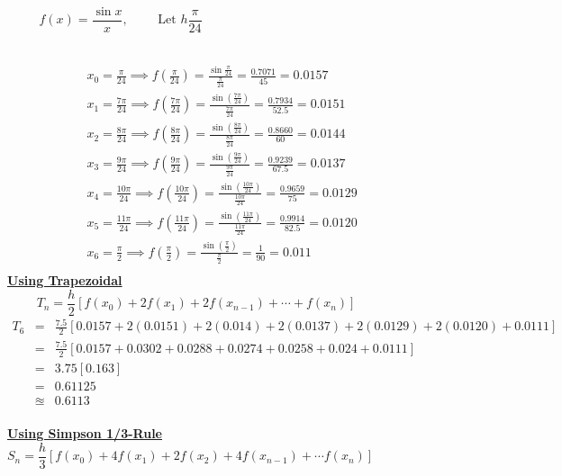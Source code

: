 \documentclass[12pt]{report}
\newcommand{\ubt}[1]{\textbf{\underline{#1}}}
\newcommand{\spn}[1]{\\[#1cm]}
\newcommand{\NI}{\noindent}
\begin{document}
	\newpage
	$$
		f(x) = \frac{\sin x}{x}, \qquad	 \text{ Let }  h \frac{\pi}{24}\qquad\qquad\qquad\qquad\qquad\qquad\qquad\qquad\qquad
	$$\spn{-0.9}
	\begin{center}
	\end{center}
	\begin{eqnarray*}
		x_0 = \frac{\pi}{24} \implies f(\frac{\pi}{24}) = \frac{\sin \frac{\pi}{24}}{\frac{\pi}{24}} = \frac{0.7071}{45} = 0.0157\qquad\qquad \spn{0.5}
		x_1 = \frac{7\pi}{24} \implies f(\frac{7\pi}{24}) = \frac{\sin(\frac{7\pi}{24})}{\frac{7\pi}{24}} = \frac{0.7934}{52.5} = 0.0151\qquad\spn{0.5}
		x_2 = \frac{8\pi}{24} \implies f(\frac{8\pi}{24}) = \frac{\sin(\frac{8\pi}{24})}{\frac{8\pi}{24}} = \frac{0.8660}{60} = 0.0144\qquad\spn{0.5}
		x_3 = \frac{9\pi}{24} \implies f(\frac{9\pi}{24}) = \frac{\sin(\frac{9\pi}{24})}{\frac{9\pi}{24}} = \frac{0.9239}{67.5} = 0.0137\qquad\spn{0.5}
		x_4 = \frac{10\pi}{24} \implies f(\frac{10\pi}{24}) = \frac{\sin(\frac{10\pi}{24})}{\frac{10\pi}{24}} = \frac{0.9659}{75} = 0.0129\;\;\spn{0.5}
		x_5 = \frac{11\pi}{24} \implies f(\frac{11\pi}{24}) = \frac{\sin(\frac{11\pi}{24})}{\frac{11\pi}{24}} = \frac{0.9914}{82.5} = 0.0120\;\;\spn{0.5}
		x_6 = \frac{\pi}{2} \implies f(\frac{\pi}{2}) = \frac{\sin(\frac{\pi}{2})}{\frac{\pi}{2}} = \frac{1}{90} = 0.0
		11\qquad\qquad\quad\;\;\spn{0.5}
	\end{eqnarray*}
	\ubt{Using Trapezoidal}
	\begin{equation*}
		T_n = \frac{h}{2}\left[f(x_0) + 2f(x_1) + 2f(x_{n-1}) + \cdots + f(x_n)\right]\qquad\qquad\qquad
	\end{equation*}
	\begin{eqnarray*}
		T_6 &=& \frac{7.5}{2}\left[0.0157 + 2(0.0151) + 2(0.014) + 2(0.0137) + 2(0.0129) + 2(0.0120) + 0.0111\right]\spn{0.5}
		&=& \frac{7.5}{2}\left[0.0157 + 0.0302 + 0.0288 + 0.0274 + 0.0258 + 0.024 + 0.0111\right]\spn{0.5}
		&=&3.75[0.163]\spn{0.5}
		&=&0.61125\spn{0.5}
		&\approxeq& 0.6113
	\end{eqnarray*}
	\\
	\NI\ubt{Using Simpson 1/3-Rule}
	$$
		S_n = \frac{h}{3}\left[f(x_0) + 4f(x_1) + 2f(x_2) + 4f(x_{n-1}) + \cdots f(x_n)\right]\qquad\qquad\qquad\qquad\qquad
	$$
\end{document}
